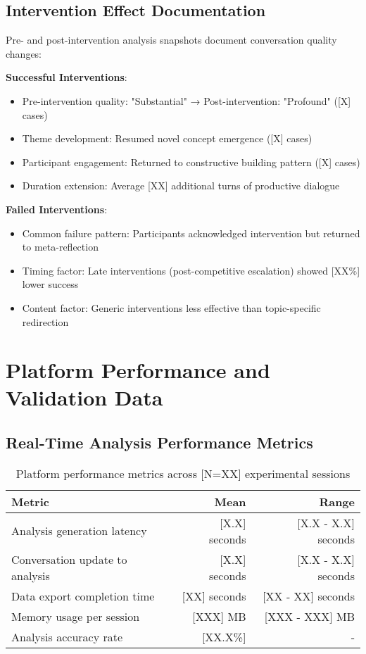 \documentclass[11pt,letterpaper]{article}
\newcommand{\totalSessions}{[N=XX]} %
\begin{document}
\subsection{Intervention Effect Documentation}

Pre- and post-intervention analysis snapshots document conversation quality changes:

\textbf{Successful Interventions}:
\begin{itemize}
    \item Pre-intervention quality: "Substantial" → Post-intervention: "Profound" ([X] cases)
    \item Theme development: Resumed novel concept emergence ([X] cases)
    \item Participant engagement: Returned to constructive building pattern ([X] cases)
    \item Duration extension: Average [XX] additional turns of productive dialogue
\end{itemize}

\textbf{Failed Interventions}:
\begin{itemize}
    \item Common failure pattern: Participants acknowledged intervention but returned to meta-reflection
    \item Timing factor: Late interventions (post-competitive escalation) showed [XX\%] lower success
    \item Content factor: Generic interventions less effective than topic-specific redirection
\end{itemize}

\section{Platform Performance and Validation Data}
\label{app:performance}

\subsection{Real-Time Analysis Performance Metrics}

\begin{table}[h]
\centering
\begin{tabular}{lrr}
\toprule
\textbf{Metric} & \textbf{Mean} & \textbf{Range} \\
\midrule
Analysis generation latency & [X.X] seconds & [X.X - X.X] seconds \\
Conversation update to analysis & [X.X] seconds & [X.X - X.X] seconds \\
Data export completion time & [XX] seconds & [XX - XX] seconds \\
Memory usage per session & [XXX] MB & [XXX - XXX] MB \\
Analysis accuracy rate & [XX.X\%] & - \\
\bottomrule
\end{tabular}
\caption{Platform performance metrics across \totalSessions{} experimental sessions}
\label{tab:performance_metrics}
\end{table}
\end{document}
